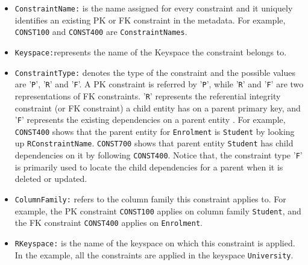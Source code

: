 \begin{itemize}
  
  \item \texttt{ConstraintName:} is the name assigned for
  every constraint and it uniquely identifies an
  existing \ac{PK} or \ac{FK} constraint in the metadata. 
   For example,  \texttt{CONST100} and \texttt{CONST400} are 
  \texttt{ConstraintNames}.
  
  \item \texttt{Keyspace:}represents the name of the Keyspace the constraint
  belongs to. 
  
  \item \texttt{ConstraintType:} denotes the type of the constraint and the
  possible values are '\texttt{P}', '\texttt{R}' and '\texttt{F}'.
	A \ac{PK} constraint is referred by '\texttt{P}', while '\texttt{R}' and
	'\texttt{F}' are two representations of \ac{FK} constraints.
	'\texttt{R}' represents the referential integrity constraint (or  \ac{FK}
	constraint) a child entity has on a parent primary key, and '\texttt{F}'
	represents the  existing dependencies on a parent entity . For example,
	\texttt{CONST400} shows that the  parent entity for \texttt{Enrolment} is
	\texttt{Student} by looking up \texttt{RConstraintName}.
	\texttt{CONST700} shows that parent entity \texttt{Student} has child
	dependencies on it by following \texttt{CONST400}. Notice that, the constraint
	type '\texttt{F}' is primarily used to locate the child dependencies for a
	parent when it is deleted or updated.

   
  \item \texttt{ColumnFamily:} refers to the column family this constraint
  applies to. For example,  the \ac{PK} constraint
  \texttt{CONST100}  applies on column family \texttt{Student}, and the \ac{FK}
  constraint \texttt{CONST400} applies on  \texttt{Enrolment}.
  
  \item \texttt{RKeyspace:} is the name of the keyspace on which this constraint
  is applied.  In the example, all the constraints  are applied in  the keyspace
  \texttt{University}.
  

\end{itemize}
